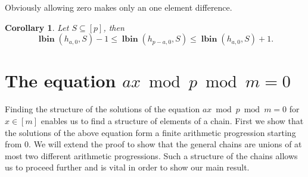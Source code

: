 \documentclass{article}
\newcommand{\lbin}[2]{\operatorname{\mathbf{lbin}}({#1}, {#2})}
\newtheorem{corollary}{Corollary}
\begin{document}
Obviously allowing zero makes only an one element difference.
\begin{corollary}
Let $S \subseteq [p]$, then
\[
\lbin{h_{a, 0}}{S} -1 \leq \lbin{h_{p - a, 0}}{S} \leq \lbin{h_{a, 0}}{S} + 1.
\]
\end{corollary}

\section{The equation $ax \bmod p \bmod m = 0$}

Finding the structure of the solutions of the equation $ax \bmod p \bmod m = 0$ for $x \in [m]$ enables us to find a structure of elements of a chain. 
First we show that the solutions of the above equation form a finite arithmetic progression starting from $0$. We will extend the proof to show that the general chains are unions of at most two different arithmetic progressions. Such a structure of the chains allows us to proceed further and is vital in order to show our main result.
\end{document}
